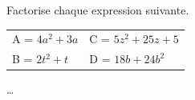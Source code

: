 \begin{exercice*}
    Factorise chaque expression suivante.

    \begin{tabular}{ll}
        A = $4a^{2} + 3a$ & C = $5z^{2} + 25z + 5$ \\
        B = $2t^{2} + t$ & D = $18b + 24b^{2}$
    \end{tabular}
\end{exercice*}
\begin{corrige}
    \dots
\end{corrige}

